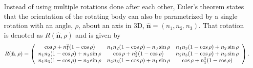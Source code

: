 Instead of using multiple rotations done  after each other, Euler's theorem states that the orientation of the rotating body can also be parametrized by a single rotation with an angle, $\rho$, about an axis in 3D, $\hat{\mathbf{n}} = (n_1, n_2, n_3)$. That rotation is denoted as $R(\hat{\mathbf{n}}, \rho)$ and is given by 
\begin{equation}
R ( \hat { \mathbf{n} } , \rho ) = \left( \begin{array} { c c c } { \cos \rho + n _ { 1 } ^ { 2 } ( 1 - \cos \rho ) } & { n _ { 1 } n _ { 2 } ( 1 - \cos \rho ) - n _ { 3 } \sin \rho } & { n _ { 1 } n _ { 3 } ( 1 - \cos \rho ) + n _ { 2 } \sin \rho } \\ { n _ { 1 } n _ { 2 } ( 1 - \cos \rho ) + n _ { 3 } \sin \rho } & { \cos \rho + n _ { 2 } ^ { 2 } ( 1 - \cos \rho ) } & { n _ { 2 } n _ { 3 } ( 1 - \cos \rho ) + n _ { 2 } \sin \rho } \\ { n _ { 1 } n _ { 3 } ( 1 - \cos \rho ) - n _ { 2 } \sin \rho } & { n _ { 2 } n _ { 3 } ( 1 - \cos \rho ) + n _ { 1 } \sin \rho } & { \cos \rho + n _ { 3 } ^ { 2 } ( 1 - \cos \rho ) } \end{array} \right).
\end{equation}

